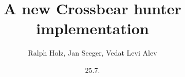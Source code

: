 \documentclass[t]{beamer}
\title[OONIBear]{A new Crossbear hunter implementation}
\author[Ralph Holz, Jan Seeger, Vedat Levi Alev]{Ralph Holz, Jan Seeger, Vedat Levi Alev}
\institute{Network Architectures and Services \\ Technische Universität München}
\date{25.7.}
\begin{document}
\begin{frame}
  \titlepage
\end{frame}










%
\end{document}
